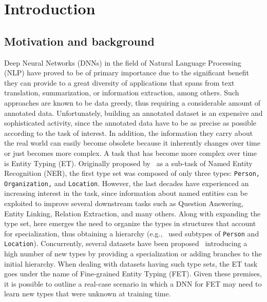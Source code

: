 \section{Introduction} \label{intro}
\subsection{Motivation and background}
Deep Neural Networks (DNNs) in the field of Natural Language Processing (NLP) have proved to be of primary importance due to the significant benefit they can provide to a great diversity of applications that spans from text translation, summarization, or information extraction, among others.
Such approaches are known to be data greedy, thus requiring a considerable amount of annotated data. Unfortunately, building an annotated dataset is an expensive and sophisticated activity, since the annotated data have to be as precise as possible according to the task of interest. In addition, the information they carry about the real world can easily become obsolete because it inherently changes over time or just becomes more complex.
A task that has become more complex over time is Entity Typing (ET). Originally proposed by~\cite{MUC6} as a sub-task of Named Entity Recognition (NER), the first type set was composed of only three types: \texttt{Person, Organization,} and \texttt{Location}. However, the last decades have experienced an increasing interest in the task, since information about named entities can be exploited to improve several downstream tasks such as Question Answering, Entity Linking, Relation Extraction, and many others. Along with expanding the type set, here emerges the need to organize the types in structures that account for specialization, thus obtaining a hierarchy (e.g.,~\cite{Fleischman2001AutomatedSO,fleischman2002fine} used subtypes of \texttt{Person} and \texttt{Location}). Concurrently, several datasets have been proposed~\cite{Ling2012FineGrainedER,bbnCoreference,ontonotes} introducing a high number of new types by providing a specialization or adding branches to the initial hierarchy. When dealing with datasets having such type sets, the ET task goes under the name of Fine-grained Entity Typing (FET). Given these premises, it is possible to outline a real-case scenario in which a DNN for FET may need to learn new types that were unknown at training time.

